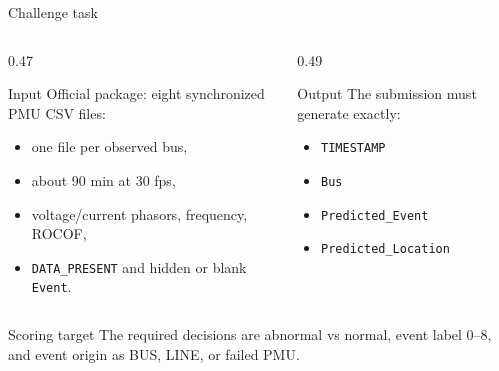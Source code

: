 ﻿\documentclass[10pt,aspectratio=169]{beamer}
\newcommand{\code}[1]{\texttt{\footnotesize #1}}
\begin{document}
\iffalse
\begin{frame}{Challenge task}
\small
\begin{columns}[T,totalwidth=\textwidth]
\begin{column}{0.47\textwidth}
\begin{block}{Input}
Official package: eight synchronized PMU CSV files:
\begin{itemize}
  \item one file per observed bus,
  \item about 90 min at 30 fps,
  \item voltage/current phasors, frequency, ROCOF,
  \item \code{DATA\_PRESENT} and hidden or blank \code{Event}.
\end{itemize}
\end{block}
\end{column}
\begin{column}{0.49\textwidth}
\begin{alertblock}{Output}
The submission must generate exactly:
\begin{itemize}
  \item \code{TIMESTAMP}
  \item \code{Bus}
  \item \code{Predicted\_Event}
  \item \code{Predicted\_Location}
\end{itemize}
\end{alertblock}
\end{column}
\end{columns}
\vspace{2mm}
\begin{exampleblock}{Scoring target}
The required decisions are abnormal vs normal, event label 0--8, and event origin as BUS, LINE, or failed PMU.
\end{exampleblock}
\end{frame}
\end{document}
